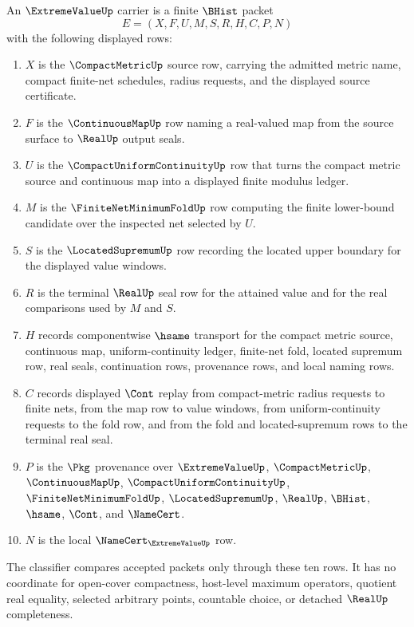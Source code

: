 \begin{definition}
\label{def:extreme-value-carrier}
An $\ExtremeValueUp$ carrier is a finite $\BHist$ packet
$$
E=(X,F,U,M,S,R,H,C,P,N)
$$
with the following displayed rows:
\begin{enumerate}
\item $X$ is the $\CompactMetricUp$ source row, carrying the admitted metric name, compact finite-net schedules, radius requests, and the displayed source certificate.
\item $F$ is the $\ContinuousMapUp$ row naming a real-valued map from the source surface to $\RealUp$ output seals.
\item $U$ is the $\CompactUniformContinuityUp$ row that turns the compact metric source and continuous map into a displayed finite modulus ledger.
\item $M$ is the $\FiniteNetMinimumFoldUp$ row computing the finite lower-bound candidate over the inspected net selected by $U$.
\item $S$ is the $\LocatedSupremumUp$ row recording the located upper boundary for the displayed value windows.
\item $R$ is the terminal $\RealUp$ seal row for the attained value and for the real comparisons used by $M$ and $S$.
\item $H$ records componentwise $\hsame$ transport for the compact metric source, continuous map, uniform-continuity ledger, finite-net fold, located supremum row, real seals, continuation rows, provenance rows, and local naming rows.
\item $C$ records displayed $\Cont$ replay from compact-metric radius requests to finite nets, from the map row to value windows, from uniform-continuity requests to the fold row, and from the fold and located-supremum rows to the terminal real seal.
\item $P$ is the $\Pkg$ provenance over $\ExtremeValueUp$, $\CompactMetricUp$, $\ContinuousMapUp$, $\CompactUniformContinuityUp$, $\FiniteNetMinimumFoldUp$, $\LocatedSupremumUp$, $\RealUp$, $\BHist$, $\hsame$, $\Cont$, and $\NameCert$.
\item $N$ is the local $\NameCert_{\ExtremeValueUp}$ row.
\end{enumerate}
The classifier compares accepted packets only through these ten rows. It has no coordinate for open-cover compactness, host-level maximum operators, quotient real equality, selected arbitrary points, countable choice, or detached $\RealUp$ completeness.
\end{definition}


